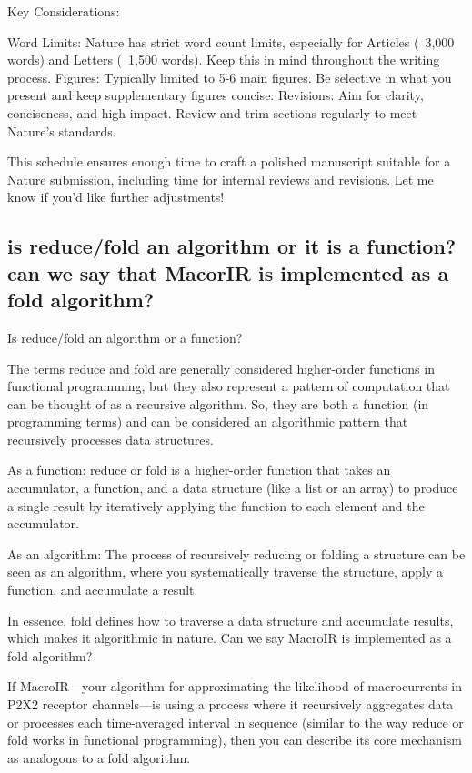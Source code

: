 \documentclass[pdflatex,sn-mathphys-num]{sn-jnl}%
\theoremstyle{thmstyleone}%
\theoremstyle{thmstyletwo}%
\theoremstyle{thmstylethree}%
\begin{document}
Key Considerations:

Word Limits: Nature has strict word count limits, especially for Articles (~3,000 words) and Letters (~1,500 words). Keep this in mind throughout the writing process.
Figures: Typically limited to 5-6 main figures. Be selective in what you present and keep supplementary figures concise.
Revisions: Aim for clarity, conciseness, and high impact. Review and trim sections regularly to meet Nature's standards.

This schedule ensures enough time to craft a polished manuscript suitable for a Nature submission, including time for internal reviews and revisions. Let me know if you'd like further adjustments!





\subsection{is reduce/fold an algorithm or it is a function? can we say that MacorIR is implemented as a fold algorithm?}
Is reduce/fold an algorithm or a function?

The terms reduce and fold are generally considered higher-order functions in functional programming, but they also represent a pattern of computation that can be thought of as a recursive algorithm. So, they are both a function (in programming terms) and can be considered an algorithmic pattern that recursively processes data structures.

As a function: reduce or fold is a higher-order function that takes an accumulator, a function, and a data structure (like a list or an array) to produce a single result by iteratively applying the function to each element and the accumulator.

As an algorithm: The process of recursively reducing or folding a structure can be seen as an algorithm, where you systematically traverse the structure, apply a function, and accumulate a result.

In essence, fold defines how to traverse a data structure and accumulate results, which makes it algorithmic in nature.
Can we say MacroIR is implemented as a fold algorithm?

If MacroIR—your algorithm for approximating the likelihood of macrocurrents in P2X2 receptor channels—is using a process where it recursively aggregates data or processes each time-averaged interval in sequence (similar to the way reduce or fold works in functional programming), then you can describe its core mechanism as analogous to a fold algorithm.
\end{document}
